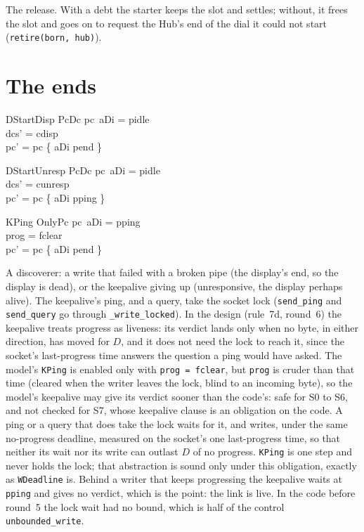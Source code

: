 \documentclass[a4paper,10pt,fleqn]{article}
\begin{document}
The release.  With a debt the starter keeps the slot and settles; without, it
frees the slot and goes on to request the Hub's end of the dial it could not
start (\texttt{retire(born, hub)}).

\section{The ends}

\begin{schema}{DStartDisp}
  PcDc
\where
  pc~aDi = pidle \\
  dcs' = cdisp \\
  pc' = pc \oplus \{ aDi \mapsto pend \}
\end{schema}

\begin{schema}{DStartUnresp}
  PcDc
\where
  pc~aDi = pidle \\
  dcs' = cunresp \\
  pc' = pc \oplus \{ aDi \mapsto pping \}
\end{schema}

\begin{schema}{KPing}
  OnlyPc
\where
  pc~aDi = pping \\
  prog = fclear \\
  pc' = pc \oplus \{ aDi \mapsto pend \}
\end{schema}

A discoverer: a write that failed with a broken pipe (the display's end, so the
display is dead), or the keepalive giving up (unresponsive, the display perhaps
alive).  The keepalive's ping, and a query, take the socket lock
(\texttt{send\_ping} and \texttt{send\_query} go through \texttt{\_write\_locked}).
In the design (rule~7d, round~6) the keepalive treats progress as liveness: its
verdict lands only when no byte, in either direction, has moved for $D$, and it
does not need the lock to reach it, since the socket's last-progress time
answers the question a ping would have asked.  The model's \texttt{KPing} is
enabled only with \texttt{prog = fclear}, but \texttt{prog} is cruder than that
time (cleared when the writer leaves the lock, blind to an incoming byte), so
the model's keepalive may give its verdict sooner than the code's: safe for S0
to S6, and not checked for S7, whose keepalive clause is an obligation on the
code.
A ping or a query that does take the lock waits for it, and writes, under the
same no-progress deadline, measured on the socket's one last-progress time, so
that neither its wait nor its write can outlast $D$ of no progress.
\texttt{KPing} is one step and never holds the lock; that abstraction is sound
only under this obligation, exactly as \texttt{WDeadline} is.  Behind a writer
that keeps progressing the keepalive waits at \texttt{pping} and gives no
verdict, which is the point: the link is live.  In the code before round~5 the
lock wait had no bound, which is half of the control \texttt{unbounded\_write}.
\end{document}

